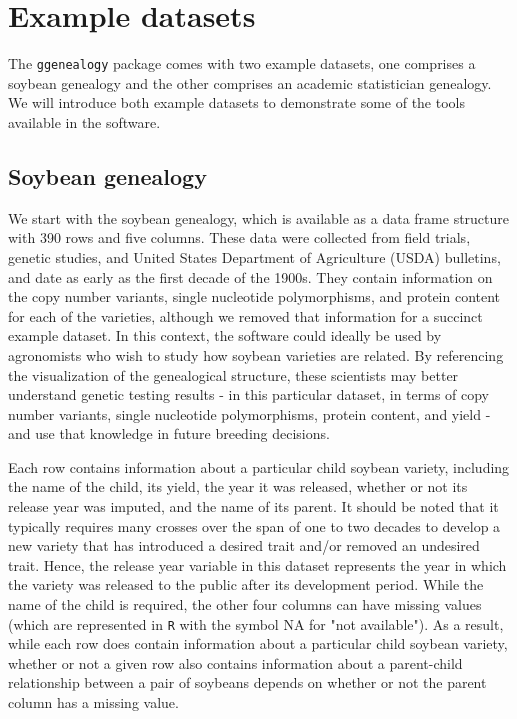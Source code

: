 \documentclass[11pt,a4paper,oldfontcommands,openany]{memoir}
\numberwithin{equation}{section} %
\newcommand{\pkg}[1]{{\texttt{#1}}}
\begin{document}
\section{Example datasets}
\label{exData}

The \pkg{ggenealogy} package comes with two example datasets, one comprises a soybean genealogy and the other comprises an academic statistician genealogy. We will introduce both example datasets to demonstrate some of the tools available in the software.

\subsection{Soybean genealogy}

We start with the soybean genealogy, which is available as a data frame structure with 390 rows and five columns. These data were collected from field trials, genetic studies, and United States Department of Agriculture (USDA) bulletins, and date as early as the first decade of the 1900s. They contain information on the copy number variants, single nucleotide polymorphisms, and protein content for each of the varieties, although we removed that information for a succinct example dataset. In this context, the software could ideally be used by agronomists who wish to study how soybean varieties are related. By referencing the visualization of the genealogical structure, these scientists may better understand genetic testing results - in this particular dataset, in terms of copy number variants, single nucleotide polymorphisms, protein content, and yield - and use that knowledge in future breeding decisions.

Each row contains information about a particular child soybean variety, including the name of the child, its yield, the year it was released, whether or not its release year was imputed, and the name of its parent. It should be noted that it typically requires many crosses over the span of one to two decades to develop a new variety that has introduced a desired trait and/or removed an undesired trait. Hence, the release year variable in this dataset represents the year in which the variety was released to the public after its development period. While the name of the child is required, the other four columns can have missing values (which are represented in \pkg{R} with the symbol NA for "not available"). As a result, while each row does contain information about a particular child soybean variety, whether or not a given row also contains information about a parent-child relationship between a pair of soybeans depends on whether or not the parent column has a missing value.
\end{document}
